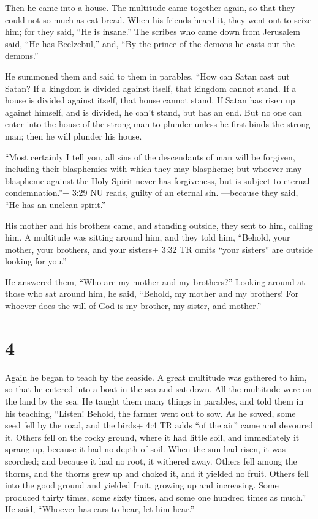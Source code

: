 Then he came into a house.  The multitude came together
again, so that they could not so much as eat bread.  When
his friends heard it, they went out to seize him; for they said, ``He is
insane.''  The scribes who came down from Jerusalem said,
``He has Beelzebul,'' and, ``By the prince of the demons he casts out
the demons.''

 He summoned them and said to them in parables, ``How can
Satan cast out Satan?  If a kingdom is divided against
itself, that kingdom cannot stand.  If a house is divided
against itself, that house cannot stand.  If Satan has
risen up against himself, and is divided, he can't stand, but has an
end.  But no one can enter into the house of the strong man
to plunder unless he first binds the strong man; then he will plunder
his house.

 ``Most certainly I tell you, all sins of the descendants
of man will be forgiven, including their blasphemies with which they may
blaspheme;  but whoever may blaspheme against the Holy
Spirit never has forgiveness, but is subject to eternal condemnation.''+
3:29 NU reads, guilty of an eternal sin.  ---because they
said, ``He has an unclean spirit.''

 His mother and his brothers came, and standing outside,
they sent to him, calling him.  A multitude was sitting
around him, and they told him, ``Behold, your mother, your brothers, and
your sisters+ 3:32 TR omits ``your sisters'' are outside looking for
you.''

 He answered them, ``Who are my mother and my brothers?''
 Looking around at those who sat around him, he said,
``Behold, my mother and my brothers!  For whoever does the
will of God is my brother, my sister, and mother.''

\hypertarget{section-3}{%
\section{4}\label{section-3}}

 Again he began to teach by the seaside. A great multitude
was gathered to him, so that he entered into a boat in the sea and sat
down. All the multitude were on the land by the sea.  He
taught them many things in parables, and told them in his teaching,
 ``Listen! Behold, the farmer went out to sow. 
As he sowed, some seed fell by the road, and the birds+ 4:4 TR adds ``of
the air'' came and devoured it.  Others fell on the rocky
ground, where it had little soil, and immediately it sprang up, because
it had no depth of soil.  When the sun had risen, it was
scorched; and because it had no root, it withered away. 
Others fell among the thorns, and the thorns grew up and choked it, and
it yielded no fruit.  Others fell into the good ground and
yielded fruit, growing up and increasing. Some produced thirty times,
some sixty times, and some one hundred times as much.''  He
said, ``Whoever has ears to hear, let him hear.''

